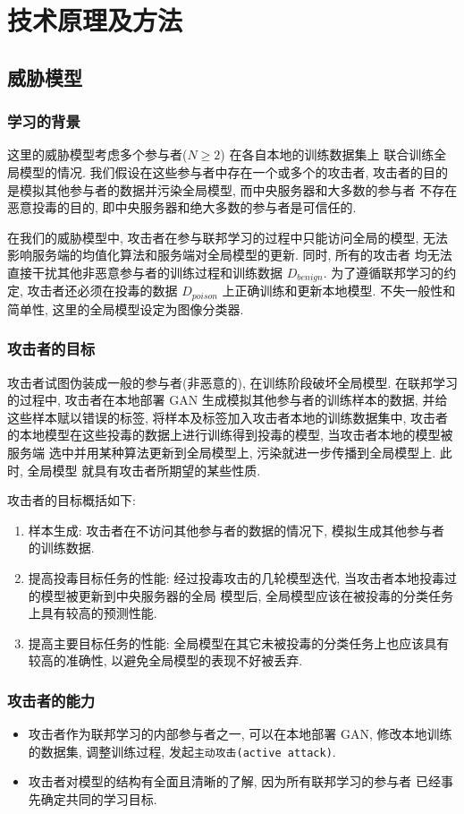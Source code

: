 \documentclass[../main.tex]{subfiles}
\begin{document}
\section{技术原理及方法}
\subsection{威胁模型}
\subsubsection{学习的背景}
这里的威胁模型考虑多个参与者($ N \geqslant 2 $) 在各自本地的训练数据集上
联合训练全局模型的情况. 我们假设在这些参与者中存在一个或多个的攻击者,
攻击者的目的是模拟其他参与者的数据并污染全局模型, 而中央服务器和大多数的参与者
不存在恶意投毒的目的, 即中央服务器和绝大多数的参与者是可信任的.

在我们的威胁模型中, 攻击者在参与联邦学习的过程中只能访问全局的模型,
无法影响服务端的均值化算法和服务端对全局模型的更新. 同时, 所有的攻击者
均无法直接干扰其他非恶意参与者的训练过程和训练数据 $ D_{benign} $.
为了遵循联邦学习的约定, 攻击者还必须在投毒的数据 $ D_{poison} $
上正确训练和更新本地模型. 不失一般性和简单性, 这里的全局模型设定为图像分类器.
%
\subsubsection{攻击者的目标}
攻击者试图伪装成一般的参与者(非恶意的), 在训练阶段破坏全局模型.
在联邦学习的过程中, 攻击者在本地部署 GAN 生成模拟其他参与者的训练样本的数据,
并给这些样本赋以错误的标签, 将样本及标签加入攻击者本地的训练数据集中, 攻击者
的本地模型在这些投毒的数据上进行训练得到投毒的模型, 当攻击者本地的模型被服务端
选中并用某种算法更新到全局模型上, 污染就进一步传播到全局模型上. 此时, 全局模型
就具有攻击者所期望的某些性质.

攻击者的目标概括如下:
\begin{enumerate}
  \item 样本生成: 攻击者在不访问其他参与者的数据的情况下, 模拟生成其他参与者
    的训练数据.
  \item 提高投毒目标任务的性能: 经过投毒攻击的几轮模型迭代, 当攻击者本地投毒过的模型被更新到中央服务器的全局
    模型后, 全局模型应该在被投毒的分类任务上具有较高的预测性能.
  \item 提高主要目标任务的性能: 全局模型在其它未被投毒的分类任务上也应该具有
    较高的准确性, 以避免全局模型的表现不好被丢弃.
\end{enumerate}
%
\subsubsection{攻击者的能力}
\begin{itemize}
  \item 攻击者作为联邦学习的内部参与者之一, 可以在本地部署 GAN,
    修改本地训练的数据集, 调整训练过程, 发起\texttt{主动攻击(active attack)}.
  \item 攻击者对模型的结构有全面且清晰的了解, 因为所有联邦学习的参与者
    已经事先确定共同的学习目标.
\end{itemize}
%
\end{document}
